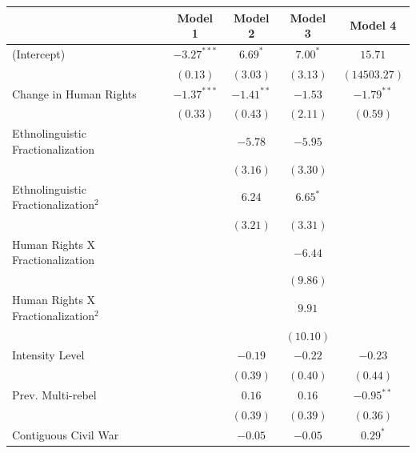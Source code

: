 \documentclass[12pt,]{book}
\let\origtable\table
\let\endorigtable\endtable
\renewenvironment{table}[1][2] {
    \singlespacing
    \expandafter\origtable\expandafter[H]
} {
    \endorigtable
}
\theoremstyle{definition}
\theoremstyle{definition}
\theoremstyle{remark}
\begin{document}
\begin{table}
\begin{center}
\begin{tabular}{l c c c c }
\hline
 & Model 1 & Model 2 & Model 3 & Model 4 \\
\hline
(Intercept)                             & $-3.27^{***}$ & $6.69^{*}$   & $7.00^{*}$ & $15.71$      \\
                                        & $(0.13)$      & $(3.03)$     & $(3.13)$   & $(14503.27)$ \\
Change in Human Rights                  & $-1.37^{***}$ & $-1.41^{**}$ & $-1.53$    & $-1.79^{**}$ \\
                                        & $(0.33)$      & $(0.43)$     & $(2.11)$   & $(0.59)$     \\
Ethnolinguistic Fractionalization       &               & $-5.78$      & $-5.95$    &              \\
                                        &               & $(3.16)$     & $(3.30)$   &              \\
Ethnolinguistic Fractionalization$^{2}$ &               & $6.24$       & $6.65^{*}$ &              \\
                                        &               & $(3.21)$     & $(3.31)$   &              \\
Human Rights X Fractionalization        &               &              & $-6.44$    &              \\
                                        &               &              & $(9.86)$   &              \\
Human Rights X Fractionalization$^{2}$  &               &              & $9.91$     &              \\
                                        &               &              & $(10.10)$  &              \\
Intensity Level                         &               & $-0.19$      & $-0.22$    & $-0.23$      \\
                                        &               & $(0.39)$     & $(0.40)$   & $(0.44)$     \\
Prev. Multi-rebel                       &               & $0.16$       & $0.16$     & $-0.95^{**}$ \\
                                        &               & $(0.39)$     & $(0.39)$   & $(0.36)$     \\
Contiguous Civil War                    &               & $-0.05$      & $-0.05$    & $0.29^{*}$   \\

\end{tabular}
\end{center}
\end{table}
\end{document}
